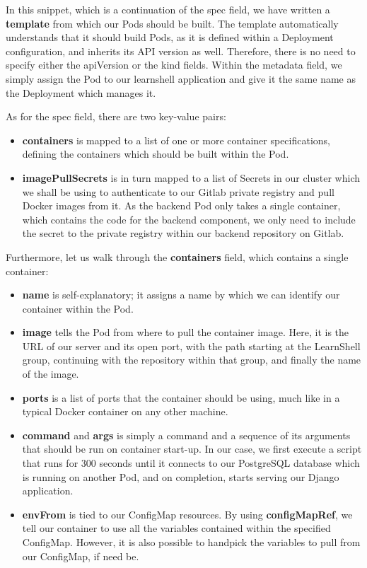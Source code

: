 \documentclass[thesis=B,english]{FITthesis}[2019/12/23]
\begin{document}
In this snippet, which is a continuation of the spec field, we have written a \textbf{template} from which our Pods should be built. The template automatically understands that it should build Pods, as it is defined within a Deployment configuration, and inherits its API version as well. Therefore, there is no need to specify either the apiVersion or the kind fields. Within the metadata field, we simply assign the Pod to our learnshell application and give it the same name as the Deployment which manages it.

As for the spec field, there are two key-value pairs: 

\begin{itemize}
  \setlength\itemsep{0em}
  \item \textbf{containers} is mapped to a list of one or more container specifications, defining the containers which should be built within the Pod.
  \item \textbf{imagePullSecrets} is in turn mapped to a list of Secrets in our cluster which we shall be using to authenticate to our Gitlab private registry and pull Docker images from it. As the backend Pod only takes a single container, which contains the code for the backend component, we only need to include the secret to the private registry within our backend repository on Gitlab.
\end{itemize}

Furthermore, let us walk through the \textbf{containers} field, which contains a single container:

\begin{itemize}
  \setlength\itemsep{0em}
  \item \textbf{name} is self-explanatory; it assigns a name by which we can identify our container within the Pod.
  \item \textbf{image} tells the Pod from where to pull the container image. Here, it is the URL of our server and its open port, with the path starting at the LearnShell group, continuing with the repository within that group, and finally the name of the image.
  \item \textbf{ports} is a list of ports that the container should be using, much like in a typical Docker container on any other machine.
  \item \textbf{command} and \textbf{args} is simply a command and a sequence of its arguments that should be run on container start-up. In our case, we first execute a script that runs for 300 seconds until it connects to our PostgreSQL database which is running on another Pod, and on completion, starts serving our Django application.
  \item \textbf{envFrom} is tied to our ConfigMap resources. By using \textbf{configMapRef}, we tell our container to use all the variables contained within the specified ConfigMap. However, it is also possible to handpick the variables to pull from our ConfigMap, if need be.
\end{itemize}
\end{document}
